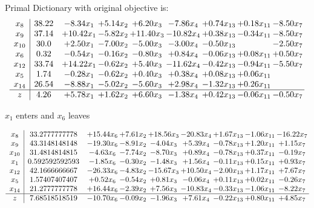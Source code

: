 \documentclass[8pt]{article}
\begin{document}
Primal Dictionary with original objective is:
\[\begin{array}{c| c c@{\hskip 2pt} c@{\hskip 2pt} c@{\hskip 2pt} c@{\hskip 2pt} c@{\hskip 2pt} c@{\hskip 2pt} c@{\hskip 2pt} }
 x_{8}   &  38.22 & -8.34 x_{1} & +  5.14 x_{2} & +  6.20 x_{3} & -7.86 x_{4} & +  0.74 x_{13} & +  0.18 x_{11} & -8.50 x_{7}\\
 x_{9}   &  37.14 & + 10.42 x_{1} & -5.82 x_{2} & + 11.40 x_{3} & -10.82 x_{4} & +  0.38 x_{13} & -0.34 x_{11} & -8.50 x_{7}\\
 x_{10}   &  30.0 & +  2.50 x_{1} & -7.00 x_{2} & -5.00 x_{3} & -3.00 x_{4} & -0.50 x_{13} &   & -2.50 x_{7}\\
 x_{6}   &  0.32 & -0.54 x_{1} & -0.16 x_{2} & -0.80 x_{3} & +  0.84 x_{4} & -0.06 x_{13} & +  0.08 x_{11} & +  0.50 x_{7}\\
 x_{12}   &  33.74 & + 14.22 x_{1} & -0.62 x_{2} & +  5.40 x_{3} & -11.62 x_{4} & -0.42 x_{13} & -0.94 x_{11} & -5.50 x_{7}\\
 x_{5}   &  1.74 & -0.28 x_{1} & -0.62 x_{2} & +  0.40 x_{3} & +  0.38 x_{4} & +  0.08 x_{13} & +  0.06 x_{11} &   \\
 x_{14}   &  26.54 & -8.88 x_{1} & -5.02 x_{2} & -5.60 x_{3} & +  2.98 x_{4} & -1.32 x_{13} & +  0.26 x_{11} &   \\
\hline
z    &  4.26 & +  5.78 x_{1} & +  1.62 x_{2} & +  6.60 x_{3} & -1.38 x_{4} & +  0.42 x_{13} & -0.06 x_{11} & -0.50 x_{7}\\
\end{array}\]


 $ x_{1} $ enters and $ x_{6} $ leaves 

 \[\begin{array}{c| c c@{\hskip 2pt} c@{\hskip 2pt} c@{\hskip 2pt} c@{\hskip 2pt} c@{\hskip 2pt} c@{\hskip 2pt} c@{\hskip 2pt} }
 x_{8}   &  33.2777777778 & + 15.44 x_{6} & +  7.61 x_{2} & + 18.56 x_{3} & -20.83 x_{4} & +  1.67 x_{13} & -1.06 x_{11} & -16.22 x_{7}\\
 x_{9}   &  43.3148148148 & -19.30 x_{6} & -8.91 x_{2} & -4.04 x_{3} & +  5.39 x_{4} & -0.78 x_{13} & +  1.20 x_{11} & +  1.15 x_{7}\\
 x_{10}   &  31.4814814815 & -4.63 x_{6} & -7.74 x_{2} & -8.70 x_{3} & +  0.89 x_{4} & -0.78 x_{13} & +  0.37 x_{11} & -0.19 x_{7}\\
 x_{1}   &  0.592592592593 & -1.85 x_{6} & -0.30 x_{2} & -1.48 x_{3} & +  1.56 x_{4} & -0.11 x_{13} & +  0.15 x_{11} & +  0.93 x_{7}\\
 x_{12}   &  42.1666666667 & -26.33 x_{6} & -4.83 x_{2} & -15.67 x_{3} & + 10.50 x_{4} & -2.00 x_{13} & +  1.17 x_{11} & +  7.67 x_{7}\\
 x_{5}   &  1.57407407407 & +  0.52 x_{6} & -0.54 x_{2} & +  0.81 x_{3} & -0.06 x_{4} & +  0.11 x_{13} & +  0.02 x_{11} & -0.26 x_{7}\\
 x_{14}   &  21.2777777778 & + 16.44 x_{6} & -2.39 x_{2} & +  7.56 x_{3} & -10.83 x_{4} & -0.33 x_{13} & -1.06 x_{11} & -8.22 x_{7}\\
\hline
z    &  7.68518518519 & -10.70 x_{6} & -0.09 x_{2} & -1.96 x_{3} & +  7.61 x_{4} & -0.22 x_{13} & +  0.80 x_{11} & +  4.85 x_{7}\\
\end{array}\]
\end{document}
